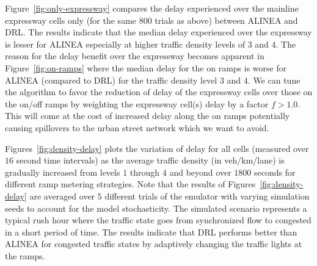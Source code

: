 \documentclass{sig-alternate-05-2015}
\begin{document}
Figure~\ref{fig:only-expressway} compares the delay experienced over the mainline expressway cells only (for the same $800$ trials as above) between ALINEA and DRL. The results indicate that the median delay experienced over the expressway is lesser for ALINEA especially at higher traffic density levels of $3$ and $4$. The reason for the delay benefit over the expressway becomes apparent in Figure~\ref{fig:on-ramps} where  the median delay for the on ramps is worse for ALINEA (compared to DRL) for the traffic density level $3$ and $4$. We can tune the algorithm to favor the reduction of delay of the expressway cells  over those on the on/off ramps by weighting the expressway cell(s) delay by a factor $f>1.0$. This will come at the cost of increased delay along the on ramps potentially causing spillovers to the urban street network which we want to avoid.


Figures~\ref{fig:density-delay} plots the variation of delay for all cells (measured over $16$ second time intervals) as the average traffic density (in veh/km/lane) is gradually increased from  levels $1$ through $4$ and beyond over $1800$ seconds for different ramp metering strategies. Note that the results of Figures~\ref{fig:density-delay} are averaged over $5$ different trials of the emulator with varying simulation seeds to account for the model stochasticity. The simulated scenario represents a typical rush hour  where the traffic state goes from synchronized flow to congested in a short period of time. The results indicate that DRL performs better than ALINEA for congested traffic states by adaptively changing the traffic lights at the ramps.
\end{document}
